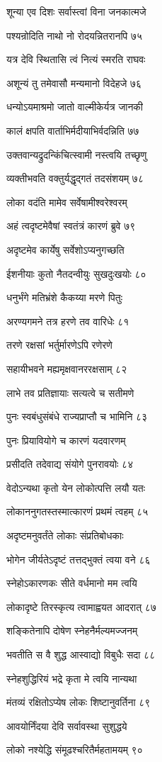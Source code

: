 शून्या एव दिशः सर्वास्त्वां विना जनकात्मजे

पश्यन्रोदिति नाथो नो रोदयन्नितरानपि ७५

यत्र देवि स्थितासि त्वं नित्यं स्मरति राघवः

अशून्यं तु तमेवासौ मन्यमानो विदेहजे ७६

धन्योऽयमाश्रमो जातो वाल्मीकेर्यत्र जानकी

कालं क्षपति वार्ताभिर्मदीयाभिर्वदन्निति ७७

उक्तवान्यद्रुदन्किंचित्स्वामी नस्त्वयि तच्छृणु

व्यक्तीभवति वक्तुर्यद्धृद्गतं तदसंशयम् ७८

लोका वदंति मामेव सर्वेषामीश्वरेश्वरम्

अहं त्वदृष्टमेवैषां स्वतंत्रं कारणं ब्रुवे ७९

अदृष्टमेव कार्येषु सर्वेशोऽप्यनुगच्छति

ईशनीयाः कुतो नैतदन्वीयुः सुखदुःखयोः ८०

धनुर्भंगे मतिभ्रंशे कैकय्या मरणे पितुः

अरण्यगमने तत्र हरणे तव वारिधेः ८१

तरणे रक्षसां भर्तुर्मारणेऽपि रणेरणे

सहायीभवने मह्यमृक्षवानररक्षसाम् ८२

लाभे तव प्रतिज्ञायाः सत्यत्वे च सतीमणे

पुनः स्वबंधुसंबंधे राज्यप्राप्तौ च भामिनि ८३

पुनः प्रियावियोगे च कारणं यदवारणम्

प्रसीदति तदेवाद्य संयोगे पुनरावयोः ८४

वेदोऽन्यथा कृतो येन लोकोत्पत्ति लयौ यतः

लोकाननुगतस्तस्मात्कारणं प्रथमं त्वहम् ८५

अदृष्टमनुवर्तंते लोकाः संप्रतिबोधकाः

भोगेन जीर्यतेऽदृष्टं तत्तद्भुक्तं त्वया वने ८६

स्नेहोऽकारणकः सीते वर्धमानो मम त्वयि

लोकादृष्टे तिरस्कृत्य त्वामाह्वयत आदरात् ८७

शङ्कितेनापि दोषेण स्नेहनैर्मल्यमज्जनम्

भवतीति स वै शुद्ध आस्वाद्यो विबुधैः सदा ८८

स्नेहशुद्धिरियं भद्रे कृता मे त्वयि नान्यथा

मंतव्यं रक्षितोऽप्येष लोकः शिष्टानुवर्तिना ८९

आवयोर्निंदया देवि सर्वावस्था सुशुद्धये

लोको नश्येद्धि संमूढश्चरितैर्महतामयम् ९०

